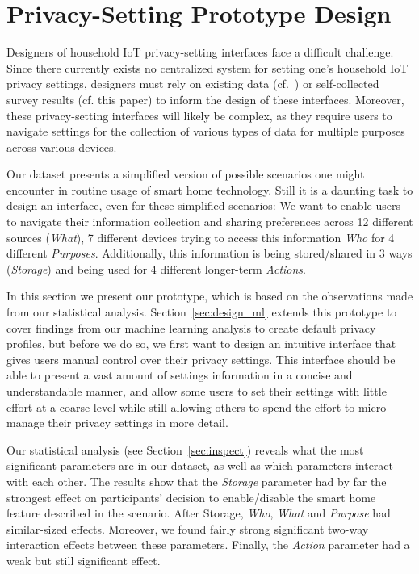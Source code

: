 \section{Privacy-Setting Prototype Design}\label{sec:design_stat}
Designers of household IoT privacy-setting interfaces face a difficult challenge. Since there currently exists no centralized system for setting one's household IoT privacy settings, designers must rely on existing data (cf.~\cite{lee2016understanding}) or self-collected survey results (cf. this paper) to inform the design of these interfaces. Moreover, these privacy-setting interfaces will likely be complex, as they require users to navigate settings for the collection of various types of data for multiple purposes across various devices. 

Our dataset presents a simplified version of possible scenarios one might encounter in routine usage of smart home technology. Still it is a daunting task to design an interface, even for these simplified scenarios: We want to enable users to navigate their information collection and sharing preferences across 12 different sources (\emph{What}), 7 different devices trying to access this information \emph{Who} for 4 different \emph{Purposes}. Additionally, this information is being stored/shared in 3 ways (\emph{Storage}) and being used for 4 different longer-term \emph{Actions}. 

In this section we present our prototype, which is based on the observations made from our statistical analysis. Section~\ref{sec:design_ml} extends this prototype to cover findings from our machine learning analysis to create default privacy profiles, but before we do so, we first want to design an intuitive interface that gives users manual control over their privacy settings. This interface should be able to present a vast amount of settings information in a concise and understandable manner, and allow some users to set their settings with little effort at a coarse level while still allowing others to spend the effort to micro-manage their privacy settings in more detail. 

Our statistical analysis (see Section~\ref{sec:inspect}) reveals what the most significant parameters are in our dataset, as well as which parameters interact with each other. The results show that the \emph{Storage} parameter had by far the strongest effect on participants' decision to enable/disable the smart home feature described in the scenario. After Storage, \emph{Who}, \emph{What} and \emph{Purpose} had similar-sized effects. Moreover, we found fairly strong significant two-way interaction effects between these parameters. Finally, the \emph{Action} parameter had a weak but still significant effect. 

